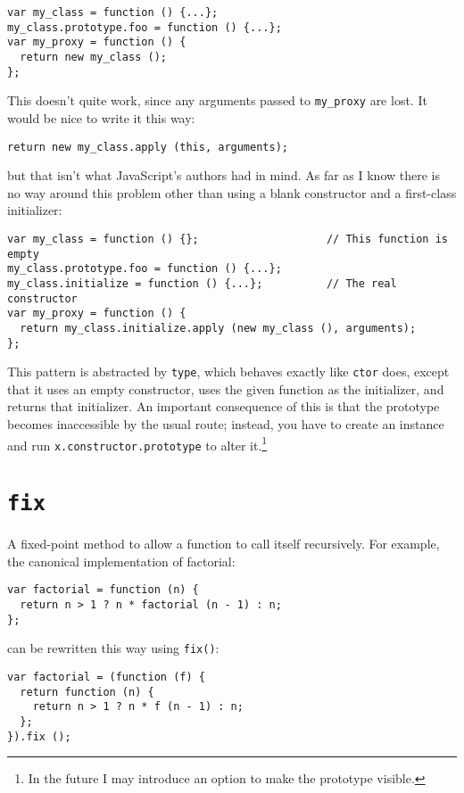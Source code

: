 \documentclass{report}
\begin{document}
\begin{verbatim}
var my_class = function () {...};
my_class.prototype.foo = function () {...};
var my_proxy = function () {
  return new my_class ();
};
\end{verbatim}

      This doesn't quite work, since any arguments passed to \verb|my_proxy| are lost. It would be nice to write it this way:

\begin{verbatim}
return new my_class.apply (this, arguments);
\end{verbatim}

      \noindent but that isn't what JavaScript's authors had in mind. As far as I know there is no way around this problem other than using a blank constructor and a first-class initializer:

\begin{verbatim}
var my_class = function () {};                    // This function is empty
my_class.prototype.foo = function () {...};
my_class.initialize = function () {...};          // The real constructor
var my_proxy = function () {
  return my_class.initialize.apply (new my_class (), arguments);
};
\end{verbatim}

      This pattern is abstracted by \verb|type|, which behaves exactly like \verb|ctor| does, except that it uses an empty constructor, uses the given function as the initializer, and returns
      that initializer. An important consequence of this is that the prototype becomes inaccessible by the usual route; instead, you have to create an instance and run
      \verb|x.constructor.prototype| to alter it.\footnote{In the future I may introduce an option to make the prototype visible.}

\section {{\tt fix}}
      A fixed-point method to allow a function to call itself recursively. For example, the canonical implementation of factorial:

\begin{verbatim}
var factorial = function (n) {
  return n > 1 ? n * factorial (n - 1) : n;
};
\end{verbatim}

      \noindent can be rewritten this way using \verb|fix()|:

\begin{verbatim}
var factorial = (function (f) {
  return function (n) {
    return n > 1 ? n * f (n - 1) : n;
  };
}).fix ();
\end{verbatim}
\end{document}
